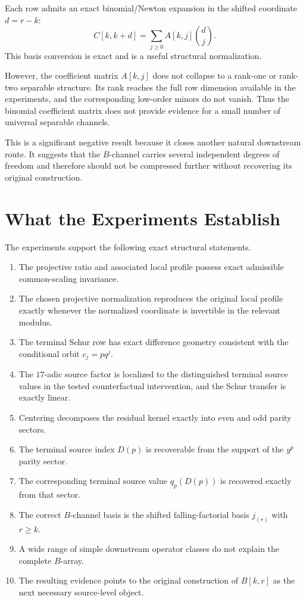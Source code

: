 \documentclass[11pt]{article}
\begin{document}
Each row admits an exact binomial/Newton expansion in the shifted coordinate $d=r-k$:
\begin{equation}
    C[k,k+d]
      =
    \sum_{j\ge0} A[k,j]\binom{d}{j}.
\end{equation}
This basis conversion is exact and is a useful structural normalization.

However, the coefficient matrix $A[k,j]$ does not collapse to a rank-one or rank-two separable structure. Its rank reaches the full row dimension available in the experiments, and the corresponding low-order minors do not vanish. Thus the binomial coefficient matrix does not provide evidence for a small number of universal separable channels.

This is a significant negative result because it closes another natural downstream route. It suggests that the $B$-channel carries several independent degrees of freedom and therefore should not be compressed further without recovering its original construction.

\section{What the Experiments Establish}

The experiments support the following exact structural statements.

\begin{enumerate}[leftmargin=2em]
    \item The projective ratio and associated local profile possess exact admissible common-scaling invariance.
    \item The chosen projective normalization reproduces the original local profile exactly whenever the normalized coordinate is invertible in the relevant modulus.
    \item The terminal Schur row has exact difference geometry consistent with the conditional orbit $c_j=pq^j$.
    \item The $17$-adic source factor is localized to the distinguished terminal source values in the tested counterfactual intervention, and the Schur transfer is exactly linear.
    \item Centering decomposes the residual kernel exactly into even and odd parity sectors.
    \item The terminal source index $D(p)$ is recoverable from the support of the $y^p$ parity sector.
    \item The corresponding terminal source value $q_p(D(p))$ is recovered exactly from that sector.
    \item The correct $B$-channel basis is the shifted falling-factorial basis $j_{(r)}$ with $r\ge k$.
    \item A wide range of simple downstream operator classes do not explain the complete $B$-array.
    \item The resulting evidence points to the original construction of $B[k,r]$ as the next necessary source-level object.
\end{enumerate}
\end{document}
